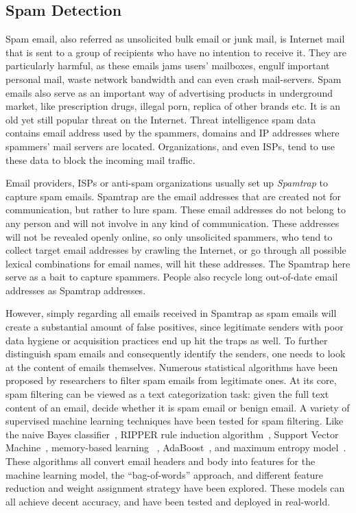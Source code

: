 \subsection{Spam Detection}
Spam email, also referred as unsolicited bulk email or junk mail, is 
Internet mail that is sent to a group of recipients who have no intention 
to receive it. They are particularly harmful, as these emails jams users' 
mailboxes, engulf important personal mail, waste network bandwidth and 
can even crash mail-servers. Spam emails also serve as an important
way of advertising products in underground market, like prescription drugs, 
illegal porn, replica of other brands etc. It is an old yet still popular
threat on the Internet. Threat intelligence spam data contains email address 
used by the spammers, domains and IP addresses where spammers' mail servers 
are located. Organizations, and even ISPs, tend to use these data to block 
the incoming mail traffic.

Email providers, ISPs or anti-spam organizations usually set up 
\textit{Spamtrap} to capture spam emails. Spamtrap are the email addresses
that are created not for communication, but rather to lure spam. These
email addresses do not belong to any person and will not involve in any
kind of communication. These addresses will not be revealed openly online,
so only unsolicited spammers, who tend to collect target email addresses
by crawling the Internet, or go through all possible lexical combinations
for email names, will hit these addresses. The Spamtrap here serve as a 
bait to capture spammers. People also recycle long out-of-date email 
addresses as Spamtrap addresses. 

However, simply regarding all emails received in Spamtrap as spam emails 
will create a substantial amount of false positives, since legitimate 
senders with poor data hygiene or acquisition practices end up hit the traps 
as well. To further distinguish spam emails and consequently identify the
senders, one needs to look at the content of emails themselves. Numerous 
statistical algorithms have been proposed by researchers to filter spam
emails from legitimate ones. At its core, spam filtering can be viewed as
a text categorization task: given the full text content of an email, 
decide whether it is spam email or benign email. A variety of supervised
machine learning techniques have been tested for spam filtering. Like the
naive Bayes classifier~\cite{androutsopoulos2000evaluation, sahami1998bayesian, schneider2003comparison}, 
RIPPER rule induction algorithm~\cite{cohen1996learning},
Support Vector Machine~\cite{drucker1999support}, memory-based learning
~\cite{androutsopoulos2000learning}, AdaBoost~\cite{carreras2001boosting},
and maximum entropy model~\cite{zhang2003filtering}. These algorithms all
convert email headers and body into features for the machine learning model, 
the ``bag-of-words'' approach,
and different feature reduction and weight assignment strategy have been
explored. These models can all achieve decent accuracy, and have been tested
and deployed in real-world. 

